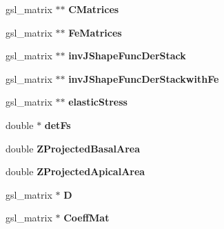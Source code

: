 \begin{DoxyCompactItemize}
\item 
\hypertarget{classShapeBase_adbb0a1617e6e0acfbf67038a5aed8366}{}gsl\+\_\+matrix $\ast$$\ast$ {\bfseries C\+Matrices}\label{classShapeBase_adbb0a1617e6e0acfbf67038a5aed8366}

\item 
\hypertarget{classShapeBase_ac3259f3f52ab4d7a514ea987012a6bd6}{}gsl\+\_\+matrix $\ast$$\ast$ {\bfseries Fe\+Matrices}\label{classShapeBase_ac3259f3f52ab4d7a514ea987012a6bd6}

\item 
\hypertarget{classShapeBase_a9478b062928ae554c25cd3269cc9e790}{}gsl\+\_\+matrix $\ast$$\ast$ {\bfseries inv\+J\+Shape\+Func\+Der\+Stack}\label{classShapeBase_a9478b062928ae554c25cd3269cc9e790}

\item 
\hypertarget{classShapeBase_a490391c781e50cfc7e2f1a0814bb6d25}{}gsl\+\_\+matrix $\ast$$\ast$ {\bfseries inv\+J\+Shape\+Func\+Der\+Stackwith\+Fe}\label{classShapeBase_a490391c781e50cfc7e2f1a0814bb6d25}

\item 
\hypertarget{classShapeBase_acd549e0086d16194ae389ae528969596}{}gsl\+\_\+matrix $\ast$$\ast$ {\bfseries elastic\+Stress}\label{classShapeBase_acd549e0086d16194ae389ae528969596}

\item 
\hypertarget{classShapeBase_ab41f6a16647607b1c898eea1c2860367}{}double $\ast$ {\bfseries det\+Fs}\label{classShapeBase_ab41f6a16647607b1c898eea1c2860367}

\item 
\hypertarget{classShapeBase_a51a8101057e2771172a4716c128705d7}{}double {\bfseries Z\+Projected\+Basal\+Area}\label{classShapeBase_a51a8101057e2771172a4716c128705d7}

\item 
\hypertarget{classShapeBase_aa7043ddacbcd92480cb54467a2777627}{}double {\bfseries Z\+Projected\+Apical\+Area}\label{classShapeBase_aa7043ddacbcd92480cb54467a2777627}

\item 
\hypertarget{classShapeBase_a1878efccfc629e53748e8907386825b0}{}gsl\+\_\+matrix $\ast$ {\bfseries D}\label{classShapeBase_a1878efccfc629e53748e8907386825b0}

\item 
\hypertarget{classShapeBase_a7266beef6c849298c3786a53259bd467}{}gsl\+\_\+matrix $\ast$ {\bfseries Coeff\+Mat}\label{classShapeBase_a7266beef6c849298c3786a53259bd467}


\end{DoxyCompactItemize}
